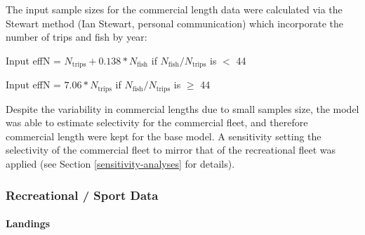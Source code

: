 \documentclass[11pt,
  english,
  a4paper,
]{article}
\begin{document}
\leavevmode\tagmcend\tagstructend\par


The input sample sizes for the commercial length data were calculated via the Stewart method (Ian Stewart, personal communication) which incorporate the number of trips and fish by year:

\leavevmode\tagmcend\tagstructend\par

\begin{centering}

Input effN = $N_{\text{trips}} + 0.138 * N_{\text{fish}}$ if $N_{\text{fish}}/N_{\text{trips}}$ is $<$ 44

Input effN = $7.06 * N_{\text{trips}}$ if $N_{\text{fish}}/N_{\text{trips}}$ is $\geq$ 44

\end{centering}


Despite the variability in commercial lengths due to small samples size, the model was able to estimate selectivity for the commercial fleet, and therefore commercial length were kept for the base model. A sensitivity setting the selectivity of the commercial fleet to mirror that of the recreational fleet was applied (see Section \ref{sensitivity-analyses} for details).

\leavevmode\tagmcend\tagstructend\par


\hypertarget{recreational-sport-data}{%
\subsubsection{Recreational / Sport Data}\label{recreational-sport-data}}

\leavevmode\tagmcend\tagstructend


\hypertarget{landings-2}{%
\paragraph{Landings}\label{landings-2}}

\leavevmode\tagmcend\tagstructend

\end{document}
